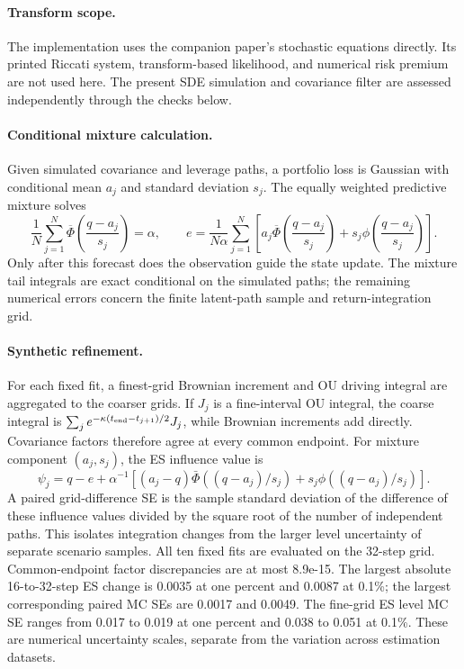 \documentclass[11pt]{article}
\theoremstyle{definition}\newtheorem{definition}[theorem]{Definition}
\theoremstyle{remark}\newtheorem{remark}[theorem]{Remark}
\begin{document}
\paragraph{Transform scope.}
The implementation uses the companion paper's stochastic equations directly. Its printed Riccati system, transform-based likelihood, and numerical risk premium are not used here. The present SDE simulation and covariance filter are assessed independently through the checks below.

\paragraph{Conditional mixture calculation.}
Given simulated covariance and leverage paths, a portfolio loss is Gaussian with conditional mean $a_j$ and standard deviation $s_j$. The equally weighted predictive mixture solves
\[
\frac1N\sum_{j=1}^N\overline\Phi\!\left(\frac{q-a_j}{s_j}\right)=\alpha,
\qquad
e=\frac1{N\alpha}\sum_{j=1}^N\left[a_j\overline\Phi\!\left(\frac{q-a_j}{s_j}\right)+s_j\phi\!\left(\frac{q-a_j}{s_j}\right)\right].
\]
Only after this forecast does the observation guide the state update. The mixture tail integrals are exact conditional on the simulated paths; the remaining numerical errors concern the finite latent-path sample and return-integration grid.

\paragraph{Synthetic refinement.}
For each fixed fit, a finest-grid Brownian increment and OU driving integral are aggregated to the coarser grids. If $J_j$ is a fine-interval OU integral, the coarse integral is $\sum_j e^{-\kappa(t_{\rm end}-t_{j+1})/2}J_j$, while Brownian increments add directly. Covariance factors therefore agree at every common endpoint. For mixture component $(a_j,s_j)$, the ES influence value is
\[
 \psi_j=q-e+\alpha^{-1}\left[(a_j-q)\bar\Phi((q-a_j)/s_j)+s_j\phi((q-a_j)/s_j)\right].
\]
A paired grid-difference SE is the sample standard deviation of the difference of these influence values divided by the square root of the number of independent paths. This isolates integration changes from the larger level uncertainty of separate scenario samples.
All ten fixed fits are evaluated on the 32-step grid. Common-endpoint factor discrepancies are at most 8.9e-15. The largest absolute 16-to-32-step ES change is 0.0035 at one percent and 0.0087 at 0.1\%; the largest corresponding paired MC SEs are 0.0017 and 0.0049. The fine-grid ES level MC SE ranges from 0.017 to 0.019 at one percent and 0.038 to 0.051 at 0.1\%. These are numerical uncertainty scales, separate from the variation across estimation datasets.
\end{document}
